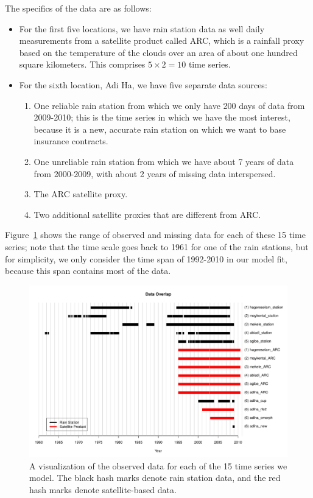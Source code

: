 \documentclass[11pt]{article}
\begin{document}
The specifics of the data are as follows:
\begin{itemize}
\item For the first five locations, we have rain station data as well daily measurements from a satellite product called ARC, which is a rainfall proxy based on the temperature of the clouds over an area of about one hundred square kilometers. This comprises $ 5 \times 2 = 10$ time series.
\item For the sixth location, Adi Ha, we have five separate data sources:
\begin{enumerate}
\item One reliable rain station from which we only have 200 days of data from 2009-2010; this is the time series in which we have the most interest, because it is a new, accurate rain station on which we want to base insurance contracts.
\item One unreliable rain station from which we have about 7 years of data from 2000-2009, with about 2 years of missing data interspersed.
\item The ARC satellite proxy.
\item Two additional satellite proxies that are different from ARC.
\end{enumerate}
\end{itemize}

Figure~\ref{fig_overlap} shows the range of observed and missing data for each of these 15 time series; note that the time scale goes back to 1961 for one of the rain stations, but for simplicity, we only consider the time span of 1992-2010 in our model fit, because this span contains most of the data.

\begin{figure}[htbp]
\begin{center}
\includegraphics[width=5.0in]{fig_observed_data_new.pdf}
\caption{A visualization of the observed data for each of the 15 time series we model. The black hash marks denote rain station data, and the red hash marks denote satellite-based data.}
\label{fig_overlap}
\end{center}
\end{figure}
\end{document}
